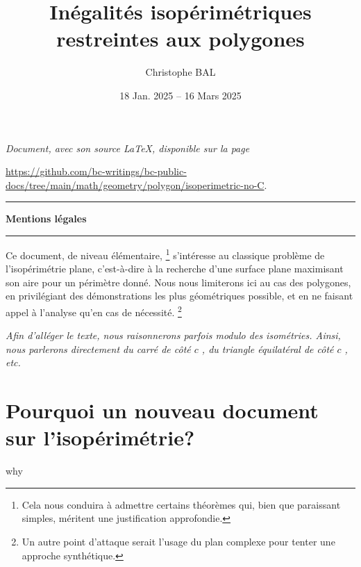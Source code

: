 \documentclass[12pt]{amsart}
\begin{document}
\title{Inégalités isopérimétriques restreintes aux polygones}
\author{Christophe BAL}
\date{18 Jan. 2025 -- 16 Mars 2025}

\maketitle

\begin{center}
	\itshape
	Document, avec son source \LaTeX, disponible sur la page

	\url{https://github.com/bc-writings/bc-public-docs/tree/main/math/geometry/polygon/isoperimetric-no-C}.
\end{center}


\bigskip


\begin{center}
	\hrule\vspace{.3em}
	{
		\fontsize{1.35em}{1em}\selectfont
		\textbf{Mentions \og légales \fg}
	}

	\vspace{0.45em}
	\doclicenseThis
	\hrule
\end{center}



\setcounter{tocdepth}{2}
\tableofcontents




\newpage

Ce document, de niveau élémentaire,%
\footnote{
    Cela nous conduira à admettre certains théorèmes qui, bien que paraissant simples, méritent une justification approfondie.
}
s'intéresse au classique problème de l'isopérimétrie plane, c'est-à-dire à la recherche d'une surface plane maximisant son aire pour un périmètre donné.
Nous nous limiterons ici au cas des polygones, en privilégiant des démonstrations les plus géométriques possible, et en ne faisant appel à l'analyse qu'en cas de nécessité.%
\footnote{
    Un autre point d'attaque serait l'usage du plan complexe pour tenter une approche synthétique.
}


\begin{tcolorbox}
    \itshape\small
    Afin d'alléger le texte, nous raisonnerons parfois modulo des isométries. Ainsi, nous parlerons directement du \og carré de côté \( c \) \fg, du \og triangle équilatéral de côté \( c \) \fg, etc.
\end{tcolorbox}




\section{Pourquoi un  nouveau document sur l'isopérimétrie?}
{why}
\end{document}
